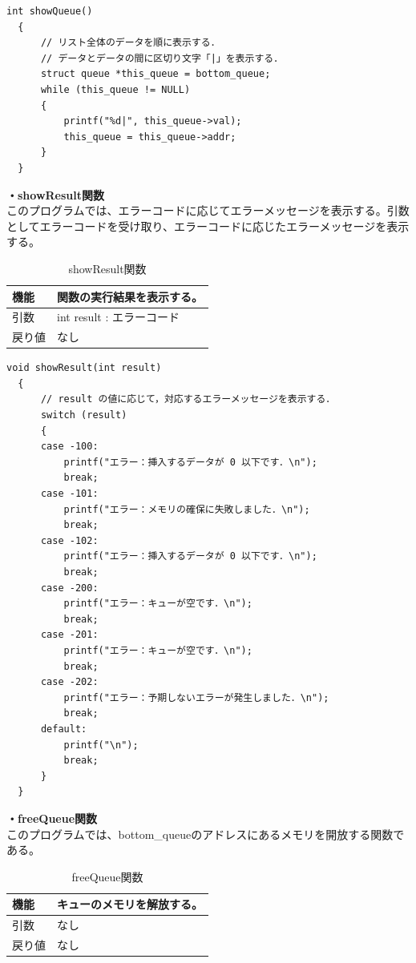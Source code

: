 \documentclass[dvipdfmx]{jsarticle}
\begin{document}
\begin{lstlisting}[caption={showQueue関数}, label={lst:showQueue_func_3}]
  int showQueue()
  {
      // リスト全体のデータを順に表示する．
      // データとデータの間に区切り文字「|」を表示する．
      struct queue *this_queue = bottom_queue;
      while (this_queue != NULL)
      {
          printf("%d|", this_queue->val);
          this_queue = this_queue->addr;
      }
  }
\end{lstlisting}  
\textbf{・showResult関数}\\
このプログラムでは、エラーコードに応じてエラーメッセージを表示する。引数としてエラーコードを受け取り、エラーコードに応じたエラーメッセージを表示する。
\begin{table}[ht]
  \centering
  \caption{showResult関数}
  \begin{tabular}{|p{5cm}|p{10cm}|}
    \hline
    機能  & 関数の実行結果を表示する。                                      \\
    \hline
    引数  & int result : エラーコード \\
    \hline
    戻り値 & なし \\
    \hline
  \end{tabular}
  \label{tab:showResult_func_3}
\end{table}
\begin{lstlisting}[caption={showResult関数}, label={lst:showResult_func_3}]
  void showResult(int result)
  {
      // result の値に応じて，対応するエラーメッセージを表示する．
      switch (result)
      {
      case -100:
          printf("エラー：挿入するデータが 0 以下です．\n");
          break;
      case -101:
          printf("エラー：メモリの確保に失敗しました．\n");
          break;
      case -102:
          printf("エラー：挿入するデータが 0 以下です．\n");
          break;
      case -200:
          printf("エラー：キューが空です．\n");
          break;
      case -201:
          printf("エラー：キューが空です．\n");
          break;
      case -202:
          printf("エラー：予期しないエラーが発生しました．\n");
          break;
      default:
          printf("\n");
          break;
      }
  }
\end{lstlisting}  
\newpage
\textbf{・freeQueue関数}\\
このプログラムでは、bottom\_queueのアドレスにあるメモリを開放する関数である。
\begin{table}[ht]
  \centering
  \caption{freeQueue関数}
  \begin{tabular}{|p{5cm}|p{10cm}|}
    \hline
    機能  & キューのメモリを解放する。                                      \\
    \hline
    引数  & なし \\
    \hline
    戻り値 & なし \\
    \hline
  \end{tabular}
  \label{tab:freeQueue_func}
\end{table}
\end{document}
